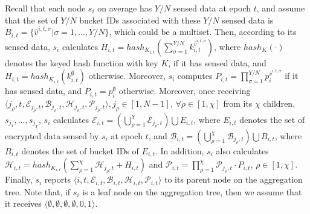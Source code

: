 \documentclass[conference]{IEEEtran}
\begin{document}
Recall that each node $s_i$ on average has $Y/N$ sensed data at epoch $t$, and assume that the set of $Y/N$ bucket IDs associated with these $Y/N$ sensed data is $B_{i,t}=\{\hat{v}^{i,t,\sigma}|\sigma=1,\dots, Y/N\}$, which could be a multiset. Then, according to its sensed data, $s_{i}$ calculates $H_{i,t}=hash_{K_{i,t}}(\sum_{\sigma=1}^{Y/N}k_{i,t}^{\hat{v}^{i,t,\sigma}})$, where $hash_{K}(\cdot)$ denotes the keyed hash function with key $K$, if it has sensed data, and $H_{i,t}=hash_{K_{i,t}}(k_{i,t}^{\emptyset})$ otherwise. Moreover, $s_i$ computes $P_{i,t}=\prod_{\sigma=1}^{Y/N}p_{i}^{\hat{v}^{i,t,\sigma}}$ if it has sensed data, and $P_{i,t}=p_i^{\emptyset}$ otherwise. Moreover, once receiving $\langle j_\rho, t, \mathcal{E}_{j_\rho,t}, \mathcal{B}_{j_\rho,t}, \mathcal{H}_{j_\rho,t}, \mathcal{P}_{j_\rho,t}\rangle, j_{\rho}\in[1,N-1]$, $\forall \rho\in [1,\chi]$ from its $\chi$ children, $s_{j_1},\dots,s_{j_\chi}$, $s_{i}$ calculates $\mathcal{E}_{i,t}=(\bigcup_{\rho=1}^{\chi}\mathcal{E}_{j_{\rho},t})\bigcup E_{i,t}$, where $E_{i,t}$ denotes the set of encrypted data sensed by $s_i$ at epoch $t$, and $\mathcal{B}_{i,t}=(\bigcup_{\rho=1}^{\chi}\mathcal{B}_{j_{\rho},t})\bigcup B_{i,t}$, where $B_{i,t}$ denotes the set of bucket IDs of $E_{i,t}$. In addition, $s_{i}$ also calculates $\mathcal{H}_{i,t}=hash_{K_{i,t}}(\sum_{\rho=1}^\chi \mathcal{H}_{j_\rho,t}+H_{i,t})$ and $\mathcal{P}_{i,t}=\prod_{\rho=1}^\chi \mathcal{P}_{j_\rho,t}\cdot P_{i,t}$, $\rho\in [1,\chi]$. Finally, $s_{i}$ reports $\langle i, t, \mathcal{E}_{i,t}, \mathcal{B}_{i,t}, \mathcal{H}_{i,t}, \mathcal{P}_{i,t}\rangle$ to its parent node on the aggregation tree. Note that, if $s_i$ is a leaf node on the aggregation tree, then we assume that it receives $\langle \emptyset,\emptyset,\emptyset,\emptyset,0,1\rangle$.
\end{document}
